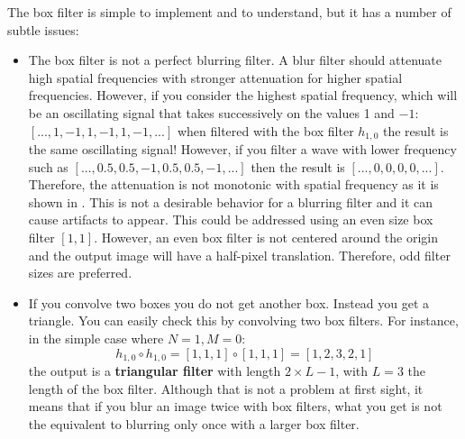 The box filter is simple to implement and to understand, but it has a number of subtle issues:
\begin{itemize}
\item {The box filter is not a perfect blurring filter. A blur filter should attenuate high spatial frequencies with stronger attenuation for higher spatial frequencies. However, if you consider the highest spatial frequency, which will be an oscillating signal that takes successively on the values 1 and $-1$: $\left[..., 1, -1, 1, -1, 1, -1, ... \right]$ when filtered with the box filter $h_{1,0}$ the result is the same oscillating signal! However, if you filter a wave with lower frequency such as $\left[..., 0.5, 0.5, -1, 0.5, 0.5, -1, ... \right]$ then the result is $\left[..., 0,0,0,0, ...\right]$. Therefore, the attenuation is not monotonic with spatial frequency as it is shown in \fig{\ref{fig:boxfilter}}. This is not a desirable behavior for a blurring filter and it can cause artifacts to appear. This could be addressed using an even size box filter $\left[1,1 \right]$. However, an even box filter is not centered around the origin and the output image will have a half-pixel translation. Therefore, odd filter sizes are preferred.}

\item {If you convolve two boxes you do not get another box. Instead you get a triangle. You can easily check this by convolving two box filters. For instance, in the simple case where $N=1, M=0$:
\begin{equation}
h_{1,0} \circ h_{1,0} = \left[1, 1, 1\right] \circ \left[1, 1, 1\right] = \left[1,2,3,2,1\right]
\end{equation}
the output  is a {\bf triangular filter} 
with length $2\times L-1$, with $L=3$ the length of the box filter. Although that is not a problem at first sight, it means that if you blur an image twice with box filters, what you get is not the equivalent to blurring only once with a larger box filter.}
\end{itemize}


